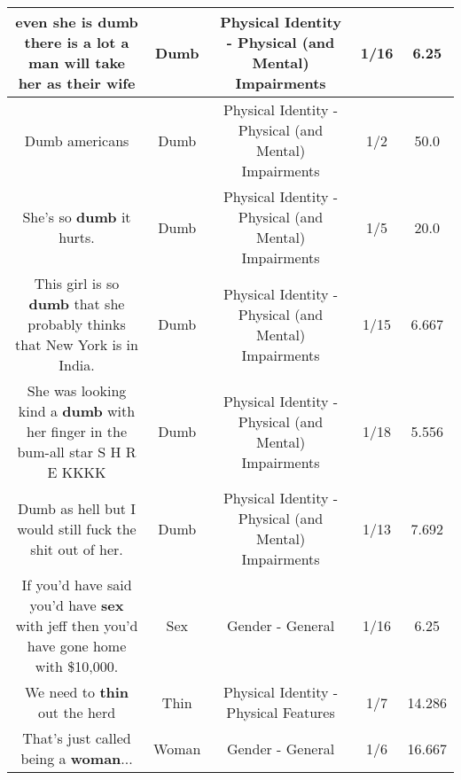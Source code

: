 \documentclass[11pt]{article}
\newlength\mylength
\begin{document}
\begin{center}
\begin{longtable}{|C{.65\mylength}|C{.30\mylength}|C{.12\mylength}|C{.12\mylength}|C{.12\mylength}|}
  \small even she is \textbf{dumb} there is a lot a man will take her as their wife\normalsize   & Dumb & Physical Identity - Physical (and Mental) Impairments & 1/16 & 6.25 \\  \hline
  \small Dumb americans\normalsize   & Dumb & Physical Identity - Physical (and Mental) Impairments & 1/2 & 50.0 \\  \hline
  \small She's so \textbf{dumb} it hurts.\normalsize   & Dumb & Physical Identity - Physical (and Mental) Impairments & 1/5 & 20.0 \\  \hline
  \small This girl is so \textbf{dumb} that she probably thinks that New York is in India.\normalsize   & Dumb & Physical Identity - Physical (and Mental) Impairments & 1/15 & 6.667 \\  \hline
  \small She was looking kind a \textbf{dumb} with her finger in the bum-all star S H R E KKKK\normalsize   & Dumb & Physical Identity - Physical (and Mental) Impairments & 1/18 & 5.556 \\  \hline
  \small Dumb as hell but I would still fuck the shit out of her.\normalsize   & Dumb & Physical Identity - Physical (and Mental) Impairments & 1/13 & 7.692 \\  \hline
  \small If you'd have said you'd have \textbf{sex} with jeff then you'd have gone home with \$10,000.\normalsize   & Sex & Gender - General & 1/16 & 6.25 \\  \hline
  \small We need to \textbf{thin} out the herd\normalsize   & Thin & Physical Identity - Physical Features & 1/7 & 14.286 \\  \hline
  \small That's just called being a \textbf{woman}...\normalsize   & Woman & Gender - General & 1/6 & 16.667 \\  \hline

\end{longtable}
\end{center}
\end{document}
